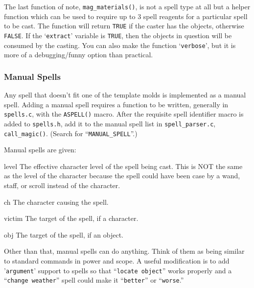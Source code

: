 \documentclass[11pt]{article}
\newenvironment{Ventry}[1]
  {\begin{list}{}{\renewcommand{\makelabel}[1]{\textsf{##1:}\hfil}
    \settowidth{\labelwidth}{\textsf{#1:}}
    \setlength{\leftmargin}{\labelwidth}
    \addtolength{\leftmargin}{\labelsep}
  }
  }
  {\end{list}}
\begin{document}
\par
The last function of note, \texttt{mag\_materials()}, is not a spell type at all but a helper function which can be used to require up to 3 spell reagents for a particular spell to be cast.  The function will return \texttt{TRUE} if the caster has the objects, otherwise \texttt{FALSE}.  If the `\texttt{extract}' variable is \texttt{TRUE}, then the objects in question will be consumed by the casting.  You can also make the function `\texttt{verbose}', but it is more of a debugging/funny option than practical.

\subsubsection{Manual Spells}
Any spell that doesn't fit one of the template molds is implemented as a manual spell.  Adding a manual spell requires a function to be written, generally in \texttt{spells.c}, with the \texttt{ASPELL()} macro.  After the requisite spell identifier macro is added to \texttt{spells.h}, add it to the manual spell list in \texttt{spell\_parser.c}, \texttt{call\_magic()}. (Search for ``\texttt{MANUAL\_SPELL}''.)
\par
Manual spells are given:
\begin{Ventry}{victim}
\item[level] The effective character level of the spell being cast.  This is NOT the same as the level of the character because the spell could have been case by a wand, staff, or scroll instead of the character.
\item[ch] The character causing the spell.
\item[victim] The target of the spell, if a character.
\item[obj] The target of the spell, if an object.
\end{Ventry}
Other than that, manual spells can do anything.  Think of them as being similar to standard commands in power and scope.  A useful modification is to add '\texttt{argument}' support to spells so that ``\texttt{locate object}'' works properly and a ``\texttt{change weather}'' spell could make it ``\texttt{better}'' or ``\texttt{worse}.''
\end{document}
